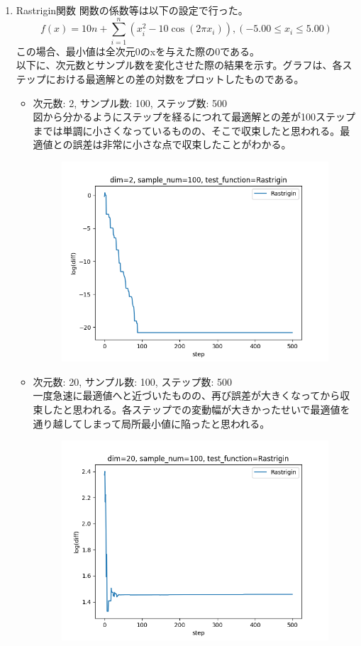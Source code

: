 \documentclass{jsarticle}
\begin{document}
\begin{enumerate}
\begin {itemize}
        \end{itemize}
    \item Rastrigin関数
        関数の係数等は以下の設定で行った。
        \begin{equation}
            f(x) = 10n + \sum_{i=1}^{n} (x_i^2 - 10\cos(2\pi x_i)),  (-5.00 \leq x_i \leq 5.00)
        \end{equation}
        この場合、最小値は全次元0のxを与えた際の0である。\\
        以下に、次元数とサンプル数を変化させた際の結果を示す。グラフは、各ステップにおける最適解との差の対数をプロットしたものである。
        \begin {itemize}
            \item 次元数: 2, サンプル数: 100, ステップ数: 500 \\
                図から分かるようにステップを経るにつれて最適解との差が100ステップまでは単調に小さくなっているものの、そこで収束したと思われる。最適値との誤差は非常に小さな点で収束したことがわかる。\\
                \begin{figure}[H]
                \includegraphics [width=10cm] {./result/Rastrigin_N_2.png}
                \end{figure}
            \item 次元数: 20, サンプル数: 100, ステップ数: 500 \\
                一度急速に最適値へと近づいたものの、再び誤差が大きくなってから収束したと思われる。各ステップでの変動幅が大きかったせいで最適値を通り越してしまって局所最小値に陥ったと思われる。 \\
                \begin{figure}[H]
                \includegraphics [width=10cm] {./result/Rastrigin_N_20.png}

\end{figure}
\end{itemize}
\end{enumerate}
\end{document}
